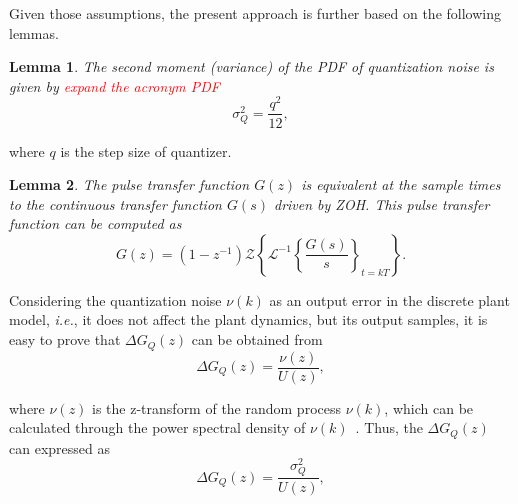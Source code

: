 \documentclass{sig-alternate-05-2015}
\newtheorem{mylemma}{Lemma}
\begin{document}
Given those assumptions, the present approach is further based on the following lemmas.
%
\begin{mylemma}
\cite{widrow1956} The second moment (variance) of the PDF of quantization noise is given by \textcolor{red}{expand the acronym PDF}
\begin{equation}
\label{eq:variancelemma}
\sigma_{Q}^{2}=\frac{q^{2}}{12},
\end{equation}
\end{mylemma}

\noindent where $q$ is the step size of quantizer.

\begin{mylemma} \cite{astrom1997computer}
The pulse transfer function $G(z)$ is equivalent at the sample times to the continuous transfer function $G(s)$ driven by ZOH. This pulse transfer function can be computed as
\begin{equation}
\label{eq:pulsetf}
G(z)=(1-z^{-1})\mathcal{Z}\left\lbrace{\mathcal{L}^{-1}\left\lbrace{\frac{G(s)}{s}}\right\rbrace_{t=kT}}\right\rbrace.
\end{equation}
\end{mylemma}


Considering the quantization noise $\nu(k)$ as an output error in the discrete plant model, {\it i.e.}, it does not affect the plant dynamics, but its output samples, it is easy to prove that $\Delta{G_{Q}(z)}$ can be obtained from
%
\begin{equation}
\label{eq:quantization_tf}
\Delta{G_{Q}(z)}=\frac{\nu(z)}{U(z)},
\end{equation}

\noindent where $\nu(z)$ is the z-transform of the random process $\nu(k)$, which can be calculated through the power spectral density of $\nu(k)$~\cite{poularikas2000transforms}. Thus, the $\Delta{G_{Q}(z)}$ can expressed as
%
\begin{equation}
\label{eq:deltag_var}
\Delta{G_{Q}(z)}=\frac{\sigma_{Q}^{2}}{U(z)},
\end{equation}
\end{document}

